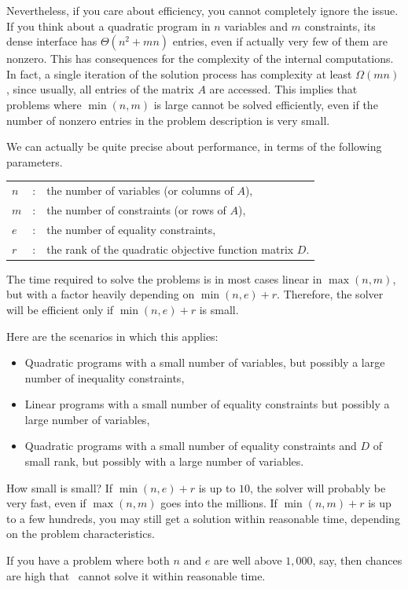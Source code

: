 Nevertheless, if you care about efficiency, you cannot completely 
ignore the issue. If
you think about a quadratic program in $n$ variables and $m$
constraints, its dense interface has $\Theta(n^2 + mn)$ entries,
even if actually very few of them are nonzero. This has consequences 
for the complexity of the internal computations. In fact, a single
iteration of the solution process has complexity at least 
$\Omega(mn)$, since usually, all entries of the matrix $A$ are accessed. 
This implies that problems where $\min(n,m)$ is large cannot be solved
efficiently, even if the number of nonzero entries in the problem
description is very small.

We can actually be quite precise about performance, in terms of the 
following parameters.
\begin{tabular}{lcl}
$n$ &: & the number of variables (or columns of $A$),\\
$m$ &: & the number of constraints (or rows of $A$),\\
$e$ &: & the number of equality constraints,\\
$r$ &: & the rank of the quadratic objective function matrix $D$.
\end{tabular}

The time required to solve the problems is in most cases linear in 
$\max(n,m)$, but with a factor heavily depending on $\min(n,e)+r$.
Therefore, the solver will be efficient only if $\min(n,e)+r$ is 
small.

Here are the scenarios in which this applies:
\begin{itemize}
\item Quadratic programs with a small number of variables, but
  possibly a large number of inequality constraints,
\item Linear programs with a small number of equality constraints but
  possibly a large number of variables,
\item Quadratic programs with a small number of equality constraints and
  $D$ of small rank, but possibly with a large number of variables.
\end{itemize} 

How small is small? If $\min(n,e)+r$ is up to $10$, the solver will
probably be very fast, even if $\max(n,m)$ goes into the millions. 
If $\min(n,m)+r$ is up to a few hundreds, you may still get a solution 
within reasonable time, depending on the problem characteristics.

If you have a problem where both $n$ and $e$ are well above
$1,000$, say, then chances are high that \cgal\ cannot solve it
within reasonable time.

